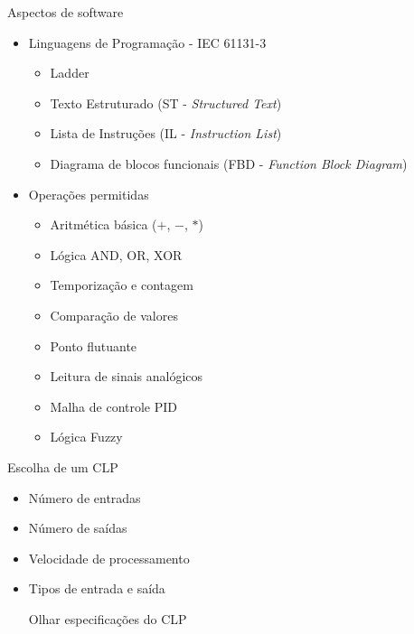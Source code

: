 \documentclass[aspectratio=169,
				xcolor=table]{beamer}
\begin{document}
	\begin{frame}[allowframebreaks]{Aspectos de software}
		\begin{itemize}
			\item Linguagens de Programação - IEC 61131-3
			\begin{itemize}
				\item Ladder
				\item Texto Estruturado (ST - \textit{Structured Text})
				\item Lista de Instruções (IL - \textit{Instruction List})
				\item Diagrama de blocos funcionais (FBD - \textit{Function Block Diagram})
			\end{itemize}
			\vspace{1em}
			\framebreak
			\item Operações permitidas
			\begin{itemize}
				\item Aritmética básica ($+$, $-$, $*$)
				\item Lógica AND, OR, XOR
				\item Temporização e contagem
				\item Comparação de valores
				\item Ponto flutuante
				\item Leitura de sinais analógicos
				\item Malha de controle PID
				\item Lógica Fuzzy				
			\end{itemize}
		\end{itemize}
	\end{frame}

	\begin{frame}{Escolha de um CLP}
		\begin{itemize}
			\item Número de entradas
			\vspace{1em}
			\item Número de saídas
			\vspace{1em}
			\item Velocidade de processamento
			\vspace{1em}
			\item Tipos de entrada e saída
			\vspace{2.5em}
			
			\begin{center}
				\centering
				\Huge
				\alert{Olhar especificações do CLP}
			\end{center}
		\end{itemize}
	\end{frame}
	
\end{document}
